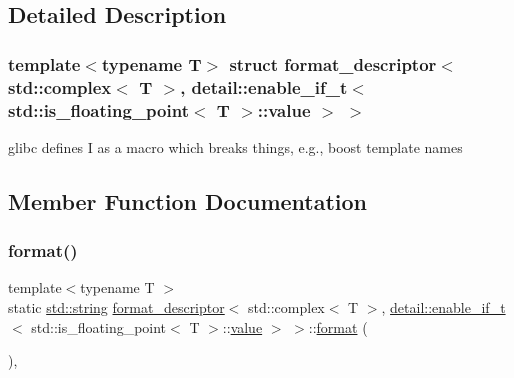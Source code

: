 \subsection{Detailed Description}
\subsubsection*{template$<$typename T$>$\newline
struct format\+\_\+descriptor$<$ std\+::complex$<$ T $>$, detail\+::enable\+\_\+if\+\_\+t$<$ std\+::is\+\_\+floating\+\_\+point$<$ T $>$\+::value $>$ $>$}

glibc defines I as a macro which breaks things, e.\+g., boost template names 

\subsection{Member Function Documentation}
\mbox{\label{structformat__descriptor_3_01std_1_1complex_3_01_t_01_4_00_01detail_1_1enable__if__t_3_01std_1_183b0c7485f88e97534b116276abc2578_a533c13d21f493e2487e71b050dff7880}} 
\subsubsection{\texorpdfstring{format()}{format()}}
{\footnotesize\ttfamily template$<$typename T $>$ \\
static \mbox{\hyperlink{_s_d_l__opengl__glext_8h_ab4ccfaa8ab0e1afaae94dc96ef52dde1}{std\+::string}} \mbox{\hyperlink{structformat__descriptor}{format\+\_\+descriptor}}$<$ std\+::complex$<$ T $>$, \mbox{\hyperlink{detail_2common_8h_a012819c9e8b5e04872a271f50f8b8196}{detail\+::enable\+\_\+if\+\_\+t}}$<$ std\+::is\+\_\+floating\+\_\+point$<$ T $>$\+::\mbox{\hyperlink{_s_d_l__opengl__glext_8h_a8ad81492d410ff2ac11f754f4042150f}{value}} $>$ $>$\+::\mbox{\hyperlink{_s_d_l__audio_8h_a71a65ffd977afe9c3fef116a5bc9ee27}{format}} (\begin{DoxyParamCaption}{ }\end{DoxyParamCaption})\hspace{0.3cm}{\ttfamily [inline]}, {\ttfamily [static]}}



